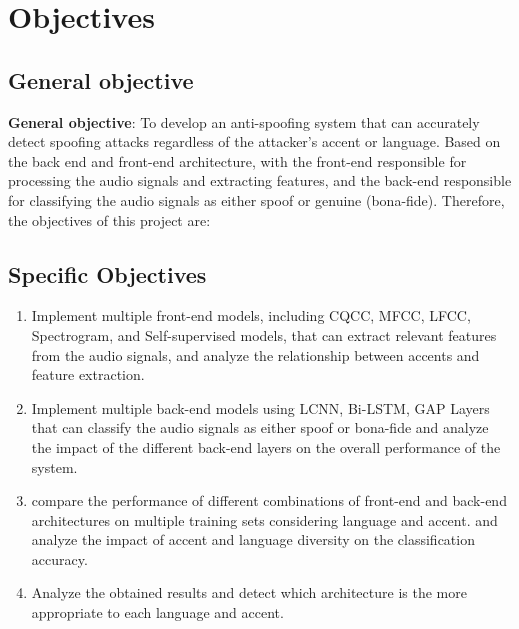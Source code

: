 \section{Objectives}

\subsection{General objective}

\textbf{General objective}: To develop an anti-spoofing system that can accurately detect spoofing attacks regardless of the attacker's accent or language. Based on the back end and front-end architecture, with the front-end responsible for processing the audio signals and extracting features, and the back-end responsible for classifying the audio signals as either spoof or genuine (bona-fide). Therefore, the objectives of this project are:

\subsection{Specific Objectives}

\begin{enumerate}
    \item Implement multiple front-end models, including \acs{CQCC}, \acs{MFCC}, \acs{LFCC}, Spectrogram, and Self-supervised models, that can extract relevant features from the audio signals, and analyze the relationship between accents and feature extraction.
    \item Implement multiple back-end models using \acs{LCNN}, \acs{Bi-LSTM}, \acs{GAP} Layers that can classify the audio signals as either spoof or bona-fide and analyze the impact of the different back-end layers on the overall performance of the system.
    \item compare the performance of different combinations of front-end and back-end architectures on multiple training sets considering language and accent. and analyze the impact of accent and language diversity on the classification accuracy.
    \item Analyze the obtained results and detect which architecture is the more appropriate to each language and accent.
\end{enumerate}




\endinput

